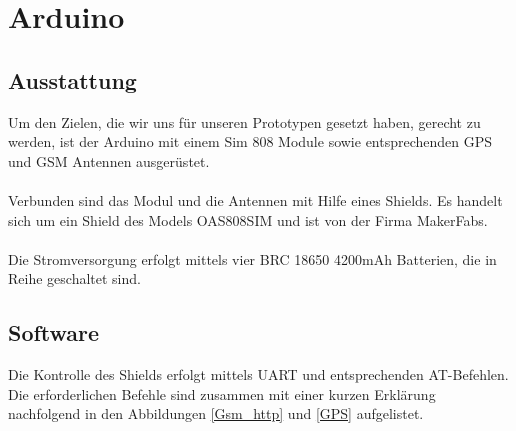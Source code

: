 \section{Arduino}
\subsection{Ausstattung}
Um den Zielen, die wir uns für unseren Prototypen gesetzt haben, gerecht zu werden, ist der Arduino mit einem Sim 808 Module sowie entsprechenden GPS und GSM Antennen ausgerüstet.
\\
\\
Verbunden sind das Modul und die Antennen mit Hilfe eines Shields. Es handelt sich um ein Shield des Models OAS808SIM und ist von der Firma MakerFabs.
\\
\\
Die Stromversorgung erfolgt mittels vier BRC 18650 4200mAh Batterien, die in Reihe geschaltet sind. 
\subsection{Software}
Die Kontrolle des Shields erfolgt mittels UART und entsprechenden AT-Befehlen. Die erforderlichen Befehle sind zusammen mit einer kurzen Erklärung nachfolgend  in den Abbildungen \ref{Gsm_http} und \ref{GPS} aufgelistet.

